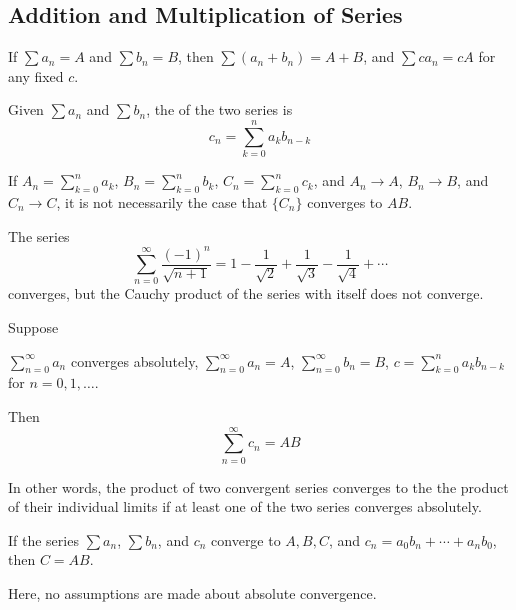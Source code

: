 \documentclass{article}
\begin{document}
\subsection{Addition and Multiplication of Series}
\begin{theorem}
    If $\sum a_{n}=A$ and $\sum b_{n}=B$, then $\sum (a_{n}+b_{n})=A+B$, and $\sum c a_{n}=cA$ for any fixed $c$.
\end{theorem}
\begin{definition}[Cauchy]
    Given $\sum a_{n}$ and $\sum b_{n}$, the  of the two series is \[c_{n}=\sum_{k=0}^{n}a_{k}b_{n-k}\]
\end{definition}
\begin{remark}
    If $A_{n}=\sum_{k=0}^{n}a_{k}$, $B_{n}=\sum_{k=0}^{n}b_{k}$, $C_{n}=\sum_{k=0}^{n}c_{k}$, and $A_{n}\rightarrow A$, $B_{n}\rightarrow B$, and $C_{n}\rightarrow C$, it is not necessarily the case that $\{C_{n}\}$ converges to $AB$.
\end{remark}
\begin{example}
    The series \[\sum_{n=0}^{\infty}\frac{(-1)^{n}}{\sqrt{n+1}}=1-\frac{1}{\sqrt{2}}+\frac{1}{\sqrt{3}}-\frac{1}{\sqrt{4}}+\dotsi\]converges, but the Cauchy product of the series with itself does not converge.
\end{example}
\begin{theorem}
    Suppose 
    \begin{enumerate}
        \ii $\sum_{n=0}^{\infty}a_{n}$ converges absolutely,
        \ii $\sum_{n=0}^{\infty}a_{n}=A$,
        \ii $\sum_{n=0}^{\infty}b_{n}=B$,
        \ii $c=\sum_{k=0}^{n}a_{k}b_{n-k}$ for $n=0,1,\dotsc$.
    \end{enumerate}
    Then \[\sum_{n=0}^{\infty}c_{n}=AB\]
\end{theorem}
In other words, the product of two convergent series converges to the the product of their individual limits if at least one of the two series converges absolutely.

\begin{theorem}
    If the series $\sum a_{n}$, $\sum b_{n}$, and $c_{n}$ converge to $A, B, C$, and $c_{n}=a_{0}b_{n}+\dotsi+a_{n}b_{0}$, then $C=AB$.
\end{theorem}
Here, no assumptions are made about absolute convergence.
 
\end{document}

